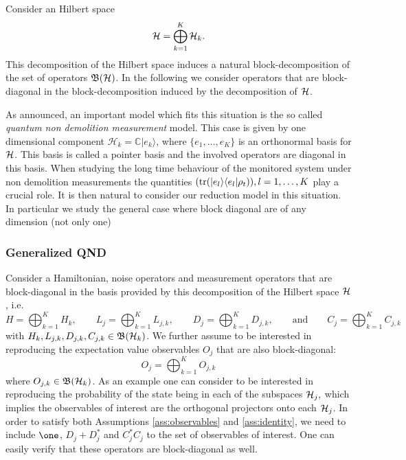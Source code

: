 \documentclass[aihp,12pt]{imsart}
\begin{document}
Consider an Hilbert space $$\mathcal{H}=\bigoplus_{k=1}^K \mathcal{H}_k.$$ This decomposition of the Hilbert space induces a natural block-decomposition of the set of operators $\mathfrak{B}(\mathcal{H})$. In the following we consider operators that are block-diagonal in the block-decomposition induced by the decomposition of $\mathcal{H}$.

As announced, an important model which fits this situation is the so called \emph{quantum non demolition measurement} model. This case is given by one dimensional component $\mathcal H_k=\mathbb C\vert e_k\rangle$, where $\{e_1,\ldots,e_K\}$ is an orthonormal basis for $\mathcal{H}$. This basis is called a pointer basis and the involved operators are diagonal in this basis. When studying the long time behaviour of the monitored system under non demolition measurements the quantities $({\rm tr}(\vert e_l\rangle\langle e_l\vert\rho_t)), l=1,\ldots,K$ play a crucial role. It is then natural to consider our reduction model in this situation. In particular we study the general case where block diagonal are of any dimension (not only one)  



\subsubsection{Generalized QND}

Consider a Hamiltonian, noise operators and measurement operators that are block-diagonal in the basis provided by this decomposition of the Hilbert space $\mathcal{H}$, i.e. 
\[H= \bigoplus_{k=1}^K H_k, \qquad L_j= \bigoplus_{k=1}^K L_{j,k}, \qquad D_j = \bigoplus_{k=1}^K D_{j,k}, \qquad\text{and}\qquad C_j = \bigoplus_{k=1}^K C_{j,k} \]
with $H_k,L_{j,k},D_{j,k},C_{j,k}\in\mathfrak{B}(\mathcal{H}_k)$.
We further assume to be interested in reproducing the expectation value observables $O_j$ that are also block-diagonal:
\[O_j = \bigoplus_{k=1}^K O_{j,k}\]
where $O_{j,k}\in\mathfrak{B}(\mathcal{H}_k)$. As an example one can consider to be interested in reproducing the probability of the state being in each of the subspaces $\mathcal{H}_j,$ which implies the observables of interest are the orthogonal projectors onto each $\mathcal{H}_j$. 
In order to satisfy both Assumptions \ref{ass:observables} and  \ref{ass:identity}, we need to include $\one$, $D_j+D_j^*$ and $C_j^* C_j$ to the set of observables of interest. One can easily verify that these operators are block-diagonal as well.
\end{document}

